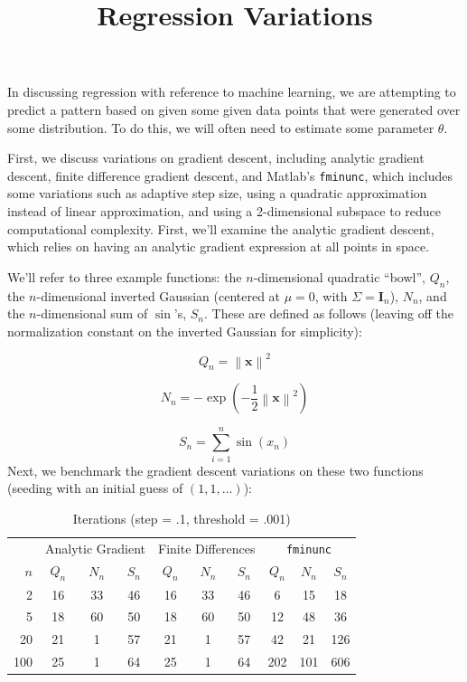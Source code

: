 \documentclass[11pt,letterpaper]{article}
\title{\vspace{-4ex}Regression Variations\vspace{-3.5ex}}
\begin{document}
\maketitle
\vspace{-0.5em}
In discussing regression with reference to machine learning, we are attempting to predict a pattern based on given some given data points that were generated over some distribution. To do this, we will often need to estimate some parameter $\theta$.

First, we discuss variations on gradient descent, including analytic gradient descent, finite difference gradient descent, and Matlab's \texttt{fminunc}, which includes some variations such as adaptive step size, using a quadratic approximation instead of linear approximation, and using a 2-dimensional subspace to reduce computational complexity. First, we'll examine the analytic gradient descent, which relies on having an analytic gradient expression at all points in space.

We'll refer to three example functions: the $n$-dimensional quadratic ``bowl'', $Q_n$, the $n$-dimensional inverted Gaussian (centered at $\mu = 0$, with $\Sigma = \mathbf I_n$), $N_n$, and the $n$-dimensional sum of $\sin$'s, $S_n$. These are defined as follows (leaving off the normalization constant on the inverted Gaussian for simplicity):

\[ Q_n = \left\| \mathbf x \right\| ^2 \]

\[ N_n = -\exp{\left(-\dfrac{1}{2} \left\| \mathbf x \right\| ^2 \right)} \]

\[ S_n = \sum_{i=1}^n \sin(x_n) \]
Next, we benchmark the gradient descent variations on these two functions (seeding with an initial guess of $(1,1,\ldots)$):

\begin{table}[h]
\centering
\caption{Iterations (step = .1, threshold = .001)}
\begin{tabular}{r|ccc|ccc|ccc}
   & \multicolumn{3}{|c}{Analytic Gradient} & \multicolumn{3}{|c}{Finite Differences} & \multicolumn{3}{|c}{\texttt{fminunc}} \\
$n$& $Q_n$         & $N_n$        & $S_n$   & $Q_n$              & $N_n$   & $S_n$           & $Q_n$         & $N_n$        & $S_n$ \\\hline
2  & 16            & 33           & 46      & 16                 & 33      & 46              & 6             & 15           & 18    \\
5  & 18            & 60           & 50      & 18                 & 60      & 50              & 12            & 48           & 36    \\
20 & 21            &  1           & 57      & 21                 &  1      & 57              & 42            & 21           & 126   \\
100& 25            &  1           & 64      & 25                 &  1      & 64              & 202           & 101          & 606   
\end{tabular}
\end{table}
\end{document}
